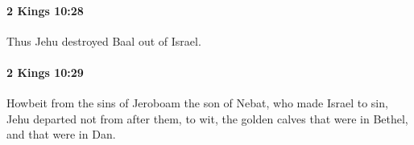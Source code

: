 		\paragraph{2 Kings 10:28} %
			\label{2KINGS-10-28}

			Thus Jehu destroyed Baal out of Israel.


		\paragraph{2 Kings 10:29} %
			\label{2KINGS-10-29}

			Howbeit from the sins of Jeroboam the son of Nebat, who made Israel to sin, Jehu departed not from after them, to wit, the golden calves that were in Bethel, and that were in Dan.


